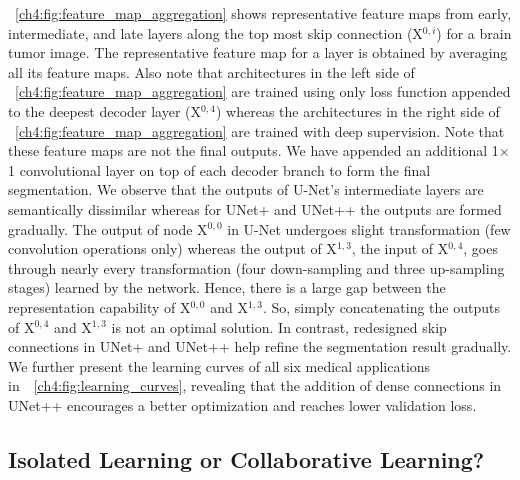 \figurename~\ref{ch4:fig:feature_map_aggregation} shows representative feature maps from early, intermediate, and late layers along the top most skip connection (\ie X$^{0,i}$) for a brain tumor image. The representative feature map for a layer is obtained by averaging all its feature maps. Also note that architectures in the left side of \figurename~\ref{ch4:fig:feature_map_aggregation} are trained using only loss function appended to the deepest decoder layer (X$^{0,4}$) whereas the architectures in the right side of \figurename~\ref{ch4:fig:feature_map_aggregation} are trained with deep supervision. 
Note that these feature maps are not the final outputs. We have appended an additional 1$\times$1 convolutional layer on top of each decoder branch to form the final segmentation.
We observe that the outputs of U-Net's intermediate layers are semantically dissimilar  whereas for UNet+ and UNet++ the outputs are formed gradually. The output of node X$^{0,0}$ in U-Net undergoes slight transformation (few convolution operations only) whereas the output of X$^{1,3}$, the input of X$^{0,4}$, goes through nearly every transformation (four down-sampling and three up-sampling stages) learned by the network. Hence, there is a large gap between the representation capability of X$^{0,0}$ and X$^{1,3}$. So, simply concatenating the outputs of X$^{0,4}$ and X$^{1,3}$ is not an optimal solution. In contrast, redesigned skip connections in UNet+ and UNet++ help refine the segmentation result gradually. 
We further present the learning curves of all six medical applications in~\figurename~\ref{ch4:fig:learning_curves}, revealing that the addition of dense connections in UNet++ encourages a better optimization and reaches lower validation loss.


\subsection{Isolated Learning or Collaborative Learning?}
\label{ch4:discussion_conclusion:collarborative_learning}

